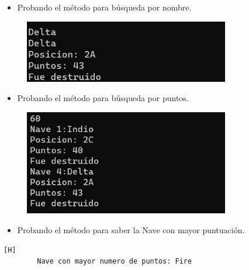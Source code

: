 \documentclass{article}
\begin{document}
	\begin{itemize}
		\item Probando el método para búsqueda por nombre.
	\end{itemize}
	\begin{figure}[H]
		\centering
	\includegraphics[width=0.8\textwidth,keepaspectratio]{img/captura5.png}
	\end{figure}
	
	\begin{itemize}
		\item Probando el método para búsqueda por puntos.
	\end{itemize}
	\begin{figure}[H]
		\centering
	\includegraphics[width=0.8\textwidth,keepaspectratio]{img/captura6.png}
	\end{figure}
	
	\begin{itemize}
		\item Probando el método para saber la Nave con mayor puntuación.
	\end{itemize}
	\begin{lstlisting}[language=bash,caption={Nave con el puntaje más alto}][H]
		Nave con mayor numero de puntos: Fire
	\end{lstlisting}
	
\end{document}
